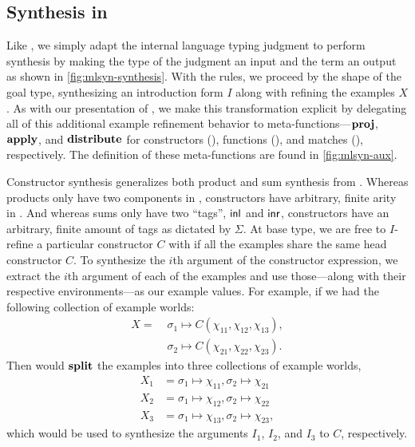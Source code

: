 \subsection{Synthesis in \texorpdfstring{\mlsyn{}}{MLsyn}}
\label{subsec:synthesis-in-mlsyn}





Like \lsyn{}, we simply adapt the internal language typing judgment to perform synthesis by making the type of the judgment an input and the term an output as shown in \autoref{fig:mlsyn-synthesis}.
With the  rules, we proceed by the shape of the goal type, synthesizing an introduction form $I$ along with refining the examples $Χ$.
As with our presentation of \lsyn{}, we make this transformation explicit by delegating all of this additional example refinement behavior to meta-functions---$\mathbf{proj}$, $\mathbf{apply}$, and $\mathbf{distribute}$ for constructors (), functions (), and matches (), respectively.
The definition of these meta-functions are found in \autoref{fig:mlsyn-aux}.

Constructor synthesis generalizes both product and sum synthesis from \lsyn{}.
Whereas products only have two components in \lsyn{}, constructors have arbitrary, finite arity in \mlsyn{}.
And whereas sums only have two ``tags'', $\minl{\!}$ and $\minr{\!}$, constructors have an arbitrary, finite amount of tags as dictated by $Σ$.
At base type, we are free to $I$-refine a particular constructor $C$ with  if all the examples share the same head constructor $C$.
To synthesize the $i$th argument of the constructor expression, we extract the $i$th argument of each of the examples and use those---along with their respective environments---as our example values.
For example, if we had the following collection of example worlds:
\begin{align*}
  Χ =\;& σ_1 ↦ C(χ_{11}, χ_{12}, χ_{13}), \\
       & σ_2 ↦ C(χ_{21}, χ_{22}, χ_{23}).
\end{align*}
Then  would $\mathbf{split}$ the examples into three collections of example worlds,
\begin{align*}
  Χ_1 &= σ_1 ↦ χ_{11}, σ_2 ↦ χ_{21} \\
  Χ_2 &= σ_1 ↦ χ_{12}, σ_2 ↦ χ_{22} \\
  Χ_3 &= σ_1 ↦ χ_{13}, σ_2 ↦ χ_{23},
\end{align*}
which would be used to synthesize the arguments $I_1$, $I_2$, and $I_3$ to $C$, respectively.

